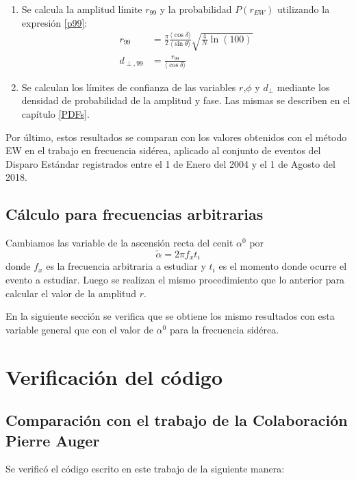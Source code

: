 \begin{enumerate}
    \item Se calcula la amplitud límite $r_{99}$ y la probabilidad  $P(r_{EW})$ utilizando la expresión \ref{p99}:
    \begin{align*}
        r_{99} &= \frac{\pi}{2} \frac{\langle\cos\delta \rangle}{\langle\sin\theta \rangle}\sqrt{\frac{4}{N}\ln(100)}\\
        d_{\perp,99} &= \frac{r_{99}}{\langle\cos\delta \rangle}    
    \end{align*}

    \item Se calculan los límites de confianza de las variables $r$,$\phi$ y $d_\perp$ mediante los densidad de probabilidad de la amplitud y fase. Las mismas se describen en el capítulo \ref{PDFs}.


\end{enumerate}


Por último, estos resultados se comparan con los valores obtenidos con el método EW en el trabajo \cite{Aab_2020} en frecuencia sidérea, aplicado al conjunto de eventos del Disparo Estándar registrados entre el 1 de Enero del 2004 y el 1 de Agosto del 2018. 


\subsection{Cálculo para frecuencias  arbitrarias}

Cambiamos las variable de la ascensión recta del cenit $\alpha^0$ por
\begin{equation}
    \tilde{\alpha} = 2\pi f_x t_i  \label{ra_arb}
  \end{equation}
donde $f_x$ es la frecuencia arbitraria a estudiar y $t_i$ es el momento donde ocurre el evento a estudiar. Luego se realizan el mismo procedimiento que lo anterior para calcular el valor de la amplitud $r$.

En la siguiente sección se verifica que se obtiene los mismo resultados con esta variable general que con el valor de $\alpha^0$ para la frecuencia sidérea.

\section{Verificación del código}

\subsection{Comparación con el trabajo de la Colaboración Pierre Auger}
Se verificó el código escrito en este trabajo de la siguiente manera:

